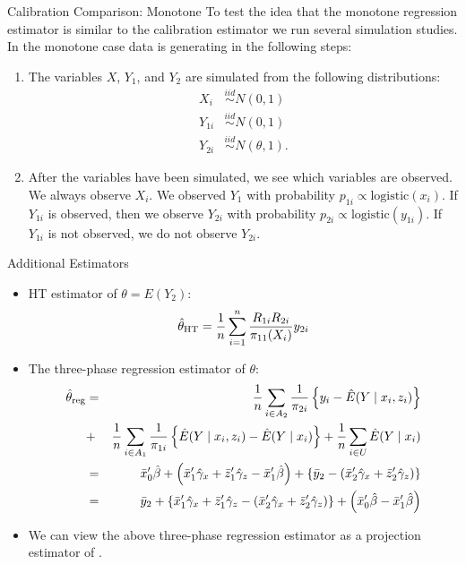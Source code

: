 \documentclass{beamer} %
\newcommand{\logistic}{{\text{logistic}}}
\begin{document}
\begin{frame}{Calibration Comparison: Monotone}
  To test the idea that the monotone regression estimator is similar to
    the calibration estimator we run several simulation studies. In the monotone
    case data is generating in the following steps:

    \begin{enumerate}
      \item The variables $X$, $Y_1$, and $Y_2$ are simulated from the following
        distributions:
        \begin{align*}
          X_i &\stackrel{iid}{\sim} N(0, 1) \\
          Y_{1i} &\stackrel{iid}{\sim} N(0, 1) \\
          Y_{2i} &\stackrel{iid}{\sim} N(\theta, 1).
        \end{align*}

      \item After the variables have been simulated, we see which variables are
        observed. We always observe $X_i$. We observed $Y_1$ with
        probability $p_{1i} \propto \logistic(x_i)$. If $Y_{1i}$ is observed,
        then we observe $Y_{2i}$ with probability $p_{2i} \propto
        \logistic(y_{1i})$. If $Y_{1i}$ is not observed, we do not observe
        $Y_{2i}$.
    \end{enumerate}

\end{frame}


\begin{frame}{Additional Estimators}
  \begin{itemize}
\item HT estimator of $\theta=E(Y_2)$: 
$$ \hat{\theta}_{\rm HT} = \frac{1}{n} \sum_{i=1}^n \frac{R_{1i} R_{2i}}{ \pi_{11}(X_i) } y_{2i}  $$
\item The three-phase regression estimator of $\theta$:
\begin{eqnarray*} 
\hat{\theta}_{\rm reg} &=& \frac{1}{n} \sum_{i \in A_2}\frac{1}{ \pi_{2i}  }\left\{ y_{i}  - \hat{E} ( Y \mid x_i, z_{i} ) \right\} \\
&+& \frac{1}{n} \sum_{i \in A_1}\frac{1}{ \pi_{1i}  }\left\{ \hat{E} ( Y \mid x_i, z_{i} ) - \hat{E} ( Y \mid x_i ) \right\} + \frac{1}{n} \sum_{i \in U} \hat{E} ( Y \mid x_i ) \\
&=& \bar{x}_0' \hat{\beta} + \left( \bar{x}_1' \hat{\gamma}_x + \bar{z}_1' \hat{\gamma}_z - \bar{x}_1' \hat{\beta} \right) + \{ \bar{y}_2- (\bar{x}_2' \hat{\gamma}_x + \bar{z}_2' \hat{\gamma}_z ) \} \\
&=& \bar{y}_2 + \{ \bar{x}_1' \hat{\gamma}_x + \bar{z}_1' \hat{\gamma}_z  -  (\bar{x}_2' \hat{\gamma}_x + \bar{z}_2' \hat{\gamma}_z ) \} +\left(  \bar{x}_0' \hat{\beta} - \bar{x}_1' \hat{\beta} \right) \end{eqnarray*} 
\item We can view the above three-phase regression estimator as a projection estimator of \cite{kim2012combining}.
\end{itemize}
\end{frame}
\end{document}
